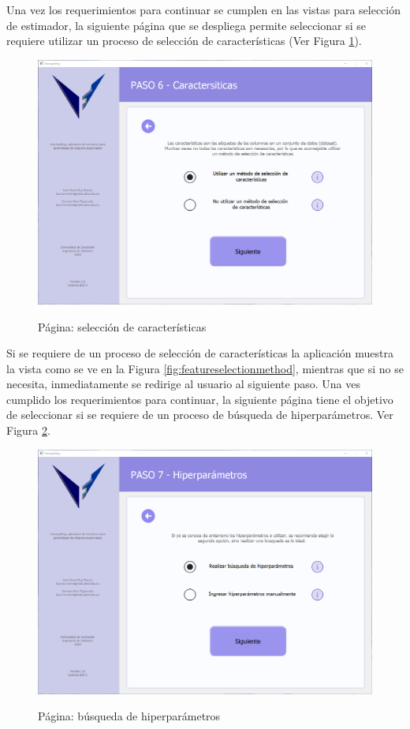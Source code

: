 Una vez los requerimientos para continuar se cumplen en las vistas para selección de estimador, la siguiente página que se despliega permite seleccionar si se requiere utilizar un proceso de selección de características (Ver Figura \ref{fig:wantfeatureselection}).

\begin{figure}[H]
    \centering
    \caption{Página: selección de características}
    \includegraphics[width=\textwidth]{images/wantfeatureselection.png}
    \label{fig:wantfeatureselection}
\end{figure}

Si se requiere de un proceso de selección de características la aplicación muestra la vista como se ve en la Figura \ref{fig:featureselectionmethod}, mientras que si no se necesita, inmediatamente se redirige al usuario al siguiente paso. Una ves cumplido los requerimientos para continuar, la siguiente página tiene el objetivo de seleccionar si se requiere de un proceso de búsqueda de hiperparámetros. Ver Figura \ref{fig:wanthiperparametersearch}.

\begin{figure}[H]
    \centering
    \caption{Página: búsqueda de hiperparámetros}
    \includegraphics[width=\textwidth]{images/wanthiperparametersearch.png}
    \label{fig:wanthiperparametersearch}
\end{figure}

